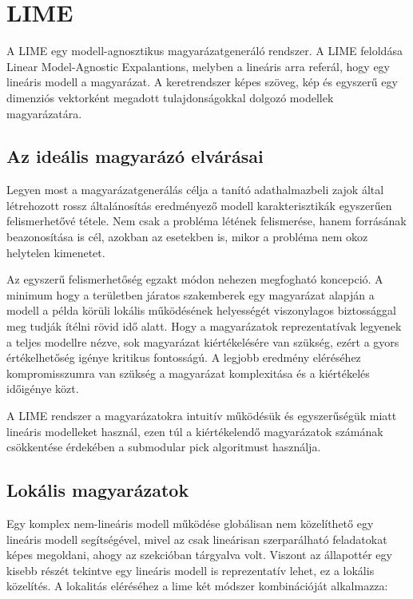 \chapter{LIME}\label{ch:lime}

A LIME egy modell-agnosztikus magyarázatgeneráló rendszer. A LIME feloldása \foreignlanguage{english}{Linear Model-Agnostic Expalantions}, melyben a lineáris arra referál, hogy egy lineáris modell a magyarázat. A keretrendszer képes szöveg, kép és egyszerű egy dimenziós vektorként megadott tulajdonságokkal dolgozó modellek magyarázatára. 

\section{Az ideális magyarázó elvárásai}

Legyen most a magyarázatgenerálás célja a tanító adathalmazbeli zajok által létrehozott rossz általánosítás eredményező modell karakterisztikák egyszerűen felismerhetővé tétele. Nem csak a probléma létének felismerése, hanem forrásának beazonosítása is cél, azokban az esetekben is, mikor a probléma nem okoz helytelen kimenetet.

Az egyszerű felismerhetőség egzakt módon nehezen megfogható koncepció. A minimum hogy a területben járatos szakemberek egy magyarázat alapján a modell a példa körüli lokális működésének helyességét viszonylagos biztossággal meg tudják ítélni rövid idő alatt. Hogy a magyarázatok reprezentatívak legyenek a teljes modellre nézve, sok magyarázat kiértékelésére van szükség, ezért a gyors értékelhetőség igénye kritikus fontosságú. A legjobb eredmény eléréséhez kompromisszumra van szükség a magyarázat komplexitása és a kiértékelés időigénye közt.

A LIME rendszer a magyarázatokra intuitív működésük és egyszerűségük miatt lineáris modelleket használ, ezen túl a kiértékelendő magyarázatok számának csökkentése érdekében a submodular pick algoritmust használja.

\section{Lokális magyarázatok}

Egy komplex nem-lineáris modell működése globálisan nem közelíthető egy lineáris modell segítségével, mivel az csak lineárisan szerparálható feladatokat képes megoldani, ahogy az  szekcióban tárgyalva volt. Viszont az állapottér egy kisebb részét tekintve egy lineáris modell is reprezentatív lehet, ez a lokális közelítés. A lokalitás eléréséhez a lime két módszer kombinációját alkalmazza:

